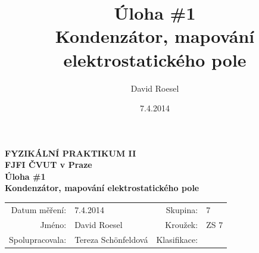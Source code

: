 \documentclass[english]{article}
\newcommand{\Author}{David Roesel}
\newcommand{\Coauthor}{Tereza Schönfeldová}
\newcommand{\Institute}{FJFI ČVUT v Praze}
\newcommand{\Subject}{FYZIKÁLNÍ PRAKTIKUM II}
\newcommand{\Group}{7}
\newcommand{\Circle}{ZS 7}
\newcommand{\Title}{Úloha \#1  \\Kondenzátor, mapování elektrostatického pole}
\newcommand{\Date}{7.4.2014}
\begin{document}
\author{\Author}
\title{\Title}
\date{\Date}

\renewcommand{\figurename}{Obr.}
\renewcommand{\tablename}{Tab.}
\renewcommand{\refname}{Reference}


\setlength{\parindent}{0cm}
\begin{multicols}{2}
\textbf{\Subject \\
        \Institute \\[0.1cm]
\Title \\[0.5cm]
}
\begin{tabular}{rlrl}
\large Datum měření: & \Date & \large Skupina: & \Group \\
\large Jméno: & \Author & \large Kroužek:  & \Circle\\
\large Spolupracovala: & \Coauthor &\large Klasifikace:\\
\end{tabular}


\end{multicols}
\end{document}
